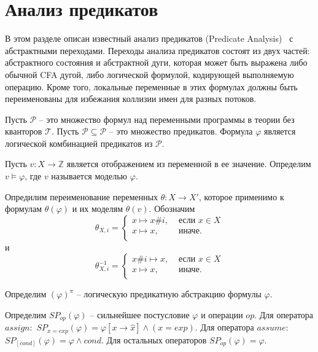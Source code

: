 \section{Анализ предикатов}
\label{sect_predicate_analysis}

В этом разделе описан известный анализ предикатов (Predicate Analysis)~\cite{Beyer10} с абстрактными переходами.
Переходы анализа предикатов состоят из двух частей: абстрактного состояния и абстрактной дуги, которая может быть выражена либо обычной CFA дугой, либо логической формулой, кодирующей выполняемую операцию.
Кроме того, локальные переменные в этих формулах должны быть переименованы для избежания коллизии имен для разных потоков.

Пусть $\mathscr{P}$ -- это множество формул над переменными программы в теории без кванторов $\mathscr{T}$.
Пусть $\mathcal{P} \subseteq \mathscr{P}$ -- это множество предикатов.
Формула $\varphi$ является логической комбинацией предикатов из $\mathscr{P}$.

Пусть $v: X \to \mathbb{Z}$ является отображением из переменной в ее значение.
Определим $v \models \varphi$, где $v$ называется моделью $\varphi$.

Опредилим переименование переменных $\theta: X \to X'$, которое применимо к формулам $\theta(\varphi)$ и их моделям $\theta(v)$.
Обозначим
$$\theta_{X,i}= 
\left\lbrace\begin{array}{ll}
x \mapsto x\#i, & \mbox{ если } x \in X\\
x \mapsto x, &\mbox{ иначе}.\\
\end{array}
\right.
$$
и
$$\theta_{X,i}^{-1}= 
\left\lbrace\begin{array}{ll}
x\#i \mapsto x, & \mbox{ если } x \in X\\
x \mapsto x, &\mbox{ иначе}.\\
\end{array}
\right.
$$

Определим $(\varphi)^\pi$ -- логическую предикатную абстракцию формулы $\varphi$.

Определим $SP_{op}(\varphi)$ -- сильнейшее постусловие $\varphi$ и операции $op$.
Для оператора $assign:$ $SP_{x = exp}(\varphi) = \varphi[x \rightarrow \hat x] \land ( x = exp)$.
Для оператора $assume:$ $SP_{[cond]}(\varphi) = \varphi \land cond$.
Для остальных операторов $SP_{op}(\varphi) = \varphi$.


